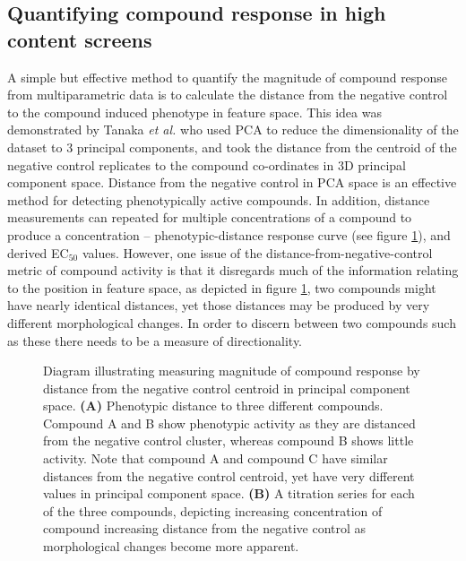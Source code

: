 \documentclass[a4paper,11pt,twoside,openright]{scrbook}
\begin{document}
\subsection{Quantifying compound response in high content screens}
A simple but effective method to quantify the magnitude of compound response from multiparametric data is to calculate the distance from the negative control to the compound induced phenotype in feature space.
This idea was demonstrated by Tanaka \textit{et al.} who used PCA to reduce the dimensionality of the dataset to 3 principal components, and took the distance from the centroid of the negative control replicates to the compound co-ordinates in 3D principal component space. \cite{Tanaka2005}
Distance from the negative control in PCA space is an effective method for detecting phenotypically active compounds.
In addition, distance measurements can repeated for multiple concentrations of a compound to produce a concentration -- phenotypic-distance response curve (see figure \ref{figure:pca_dist}), and derived EC$_{50}$ values.
However, one issue of the distance-from-negative-control metric of compound activity is that it disregards much of the information relating to the position in feature space, as depicted in figure \ref{figure:pca_dist}, two compounds might have nearly identical distances, yet those distances may be produced by very different morphological changes.
In order to discern between two compounds such as these there needs to be a measure of directionality.

\begin{figure}
    \captionsetup{width=0.8\textwidth}
    \caption[Compound distance in principal component space]{
    Diagram illustrating measuring magnitude of compound response by distance from the negative control centroid in principal component space.
    \textbf{(A)} Phenotypic distance to three different compounds.
    Compound A and B show phenotypic activity as they are distanced from the negative control cluster, whereas compound B shows little activity.
    Note that compound A and compound C have similar distances from the negative control centroid, yet have very different values in principal component space.
    \textbf{(B)} A titration series for each of the three compounds, depicting increasing concentration of compound increasing distance from the negative control as morphological changes become more apparent.
}
    
    \label{figure:pca_dist}
\end{figure}
\end{document}
